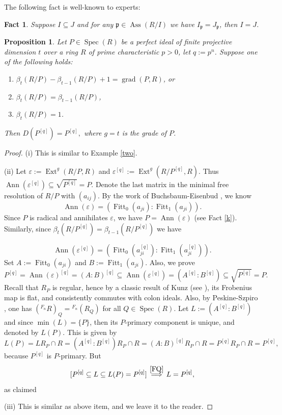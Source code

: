 \documentclass[11pt,a4paper]{amsart}
\numberwithin{equation}{section}
\newtheorem{proposition}[theorem]{Proposition}
\newtheorem{fact}[theorem]{Fact}
\DeclareMathOperator{\Ass}{Ass}
\DeclareMathOperator{\Ann}{Ann}\DeclareMathOperator{\ann}{Ann}
\DeclareMathOperator{\Spec}{Spec}
\DeclareMathOperator{\Ext}{Ext}
\newcommand{\fp}{\mathfrak{p}}
\newcommand{\up}[1]{{{}^{#1}\!}}
\begin{document}
The following fact is well-known to experts:
\begin{fact}\label{FQ}
	Suppose $I\subseteq J$ and for any $\fp\in\Ass(R/I)$ we have $I_\fp= J_\fp$, then $I=J$.
\end{fact}

\begin{proposition}\label{pp}
	Let   $P\in\Spec(R)$  be a  perfect ideal  of finite projective dimension $t$ over a ring $R$ of prime characteristic $p > 0$, let $q := p^n$. 
	Suppose one of the following holds:
	\begin{enumerate}
		\item[(i)] 
		\( \beta_t(R/P) - \beta_{t-1}(R/P) + 1 = \operatorname{grad}(P,R)
		\), or
		\item[(ii)] \(
		\beta_t(R/P) = \beta_{t-1}(R/P) \),
		\item[(iii)] $\beta_t(R/P) =1$.
	\end{enumerate}
	Then
	\(D(P^{[q]})=
	 P^{[q]}, 	
	\) where  $g=t$ is the grade of $P$. \end{proposition}



\begin{proof}
	(i) This is similar to Example \ref{two}.
	
	
	(ii) Let
	$
	\varepsilon := \Ext^g(R/P, R) $ and $\varepsilon^{[q]} := \Ext^g(R/P^{[q]}, R).
	$
	Thus $\Ann(	\varepsilon^{[q]}) \subseteq \sqrt{P^{[q]}} = P$. Denote the last matrix in the minimal free resolution of $R/P$ with $(a_{ij})$. By the work
	of Buchsbaum-Eisenbud \cite{BE},
	we know 
	\[
	\operatorname{Ann}(\varepsilon)
	= \left(\operatorname{Fitt}_0(a_{ji} ):\operatorname{Fitt}_1(a_{ji})\right)
	.\] Since
	$P$ is radical and annihilates $\varepsilon$, we have
	\(
	P = \operatorname{Ann}(\varepsilon) 
	\) (see Fact \ref{k}).
	Similarly, since
	$\beta_t(R/P^{[q]}) = \beta_{t-1}(R/P^{[q]})  $ we have
	
	
	
	
	
	\[
	\operatorname{Ann}(\varepsilon^{[q]})
	= \left(\operatorname{Fitt}_0(a_{ji}^{[q]}):\operatorname{Fitt}_1(a_{ji}^{[q]})\right)
	.
	\]
	Set $A:=\operatorname{Fitt}_0(a_{ji} )$ and $B:=\operatorname{Fitt}_1(a_{ji} )$.
	Also, we prove
	\[
	P^{[q]} = \Ann(\varepsilon)^{[q]} = (A : B)^{[q]} \subseteq \Ann(\varepsilon^{[q]}) = (A^{[q]}: B^{[q]}) \subseteq \sqrt{P^{[q]}} = P.
	\]
	Recall that $R_P$ is regular, hence by a classic result of Kunz (see \cite[Corollary 8.2.8]{BH}),  its Frobenius map is flat, and consistently commutes with colon ideals. Also, by Peskine-Szpiro \cite[Proposition 8.2.5]{BH}, one has $(\up{F_n}R)_Q=\up{F_n}(R_Q)$ for all $Q\in\Spec(R)$.
	Let $L := (A^{[q]}:B^{[q]})$ and since $\min(L) = \{P\}$, then its $P$-primary component is unique, and denoted by $L(P)$. This is given by
	\[
	L(P) =  LR_P \cap R = (A^{[q]}: B^{[q]}) R_P \cap R = (A:B)^{[q]}R_P \cap R = P^{[q]}R_P \cap R= P^{[q]},
	\] because $P^{[q]}$ is $P$-primary. {But}
	\[
	[ P^{[q]} \subseteq L \subseteq  L(P) = P^{[q]}] \stackrel{\ref{FQ}}\implies L = P^{[q]},
	\]
	as claimed	
	
	
	(iii) This is similar as above item, and we leave it to the reader.	
\end{proof}
\end{document}
